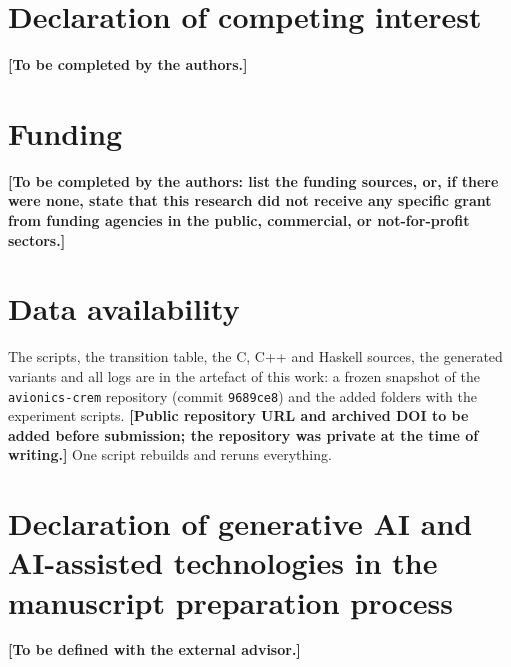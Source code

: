 \documentclass[review,12pt]{elsarticle}
\newcommand{\code}[1]{\texttt{#1}}
\begin{document}
\section*{Declaration of competing interest}
\textbf{[To be completed by the authors.]}

\section*{Funding}
\textbf{[To be completed by the authors: list the funding sources, or, if there were none, state that this research did not receive any specific grant from funding agencies in the public, commercial, or not-for-profit sectors.]}

\section*{Data availability}
The scripts, the transition table, the C, C++ and Haskell sources, the generated variants and all logs are in the artefact of this work: a frozen snapshot of the \code{avionics-crem} repository (commit \code{9689ce8}) and the added folders with the experiment scripts. \textbf{[Public repository URL and archived DOI to be added before submission; the repository was private at the time of writing.]} One script rebuilds and reruns everything.

\section*{Declaration of generative AI and AI-assisted technologies in the manuscript preparation process}
\textbf{[To be defined with the external advisor.]}



\end{document}
